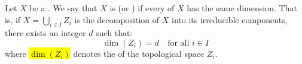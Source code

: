 \begin{definition} \label{definition:pure_dimensional_scheme}
Let $X$ be a .
We say that $X$ is  (or ) if every  of $X$ has the same dimension. That is, if $X = \bigcup_{i \in I} Z_i$ is the decomposition of $X$ into its irreducible components, there exists an integer $d$ such that:
$$\dim(Z_i) = d \quad \text{for all } i \in I$$
where \hl{$\dim(Z_i)$} denotes the  of the topological space $Z_i$.
\end{definition}